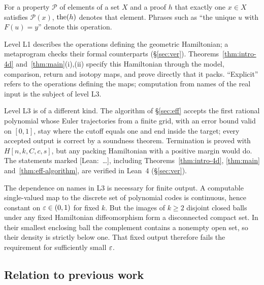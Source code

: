 \begin{definition}\label{def:intro-the}
For a property $\mathcal P$ of elements of a set $X$ and a proof $h$ that exactly one $x\in X$ satisfies
$\mathcal P(x)$, $\operatorname{the}(h)$ denotes that element. Phrases such as ``the unique $u$ with $F(u)=y$''
denote this operation.
\end{definition}

Level L1 describes the operations defining the geometric Hamiltonian; a metaprogram checks their formal
counterparts (\S\ref{sec:ver}). Theorems~\ref{thm:intro-4d} and~\ref{thm:main}(i),(ii) specify this Hamiltonian
through the model, comparison, return and isotopy maps, and prove directly that it packs. ``Explicit'' refers to
the operations defining the maps; computation from names of the real input is the subject of level L3.

Level L3 is of a different kind. The algorithm of \S\ref{sec:eff} accepts the first rational polynomial whose Euler
trajectories from a finite grid, with an error bound valid on $[0,1]$, stay where the cutoff equals one and end inside
the target; every accepted output is correct by a soundness theorem. Termination is proved with $H[n,k,C,c,s]$, but any
packing Hamiltonian with a positive margin would do. The statements marked [Lean:~\dots], including
Theorems~\ref{thm:intro-4d}, \ref{thm:main} and~\ref{thm:eff-algorithm}, are verified in Lean~4 (\S\ref{sec:ver}).

The dependence on names in L3 is necessary for finite output. A computable single-valued map to the discrete set
of polynomial codes is continuous, hence constant on $\varepsilon\in(0,1)$ for fixed $k$. But the images of $k\ge2$
disjoint closed balls under any fixed Hamiltonian diffeomorphism form a disconnected compact set. In their
smallest enclosing ball the complement contains a nonempty open set, so their density is strictly below one.
That fixed output therefore fails the requirement for sufficiently small $\varepsilon$.

\subsection{Relation to previous work}\label{sec:intro-prior}

